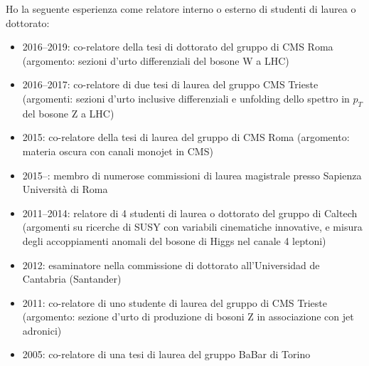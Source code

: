 \documentclass[11pt,twoside,a4paper]{article}
\begin{document}
Ho la seguente esperienza come relatore interno o esterno di studenti di laurea o dottorato:
\begin{itemize}
\item 2016--2019: co-relatore della tesi di dottorato del gruppo di
  CMS Roma (argomento: sezioni d'urto differenziali del bosone W a
  LHC)
\item 2016--2017: co-relatore di due tesi di laurea del gruppo CMS
  Trieste (argomenti: sezioni d'urto inclusive differenziali e
  unfolding dello spettro in $p_T$ del bosone Z a LHC)
\item 2015: co-relatore della tesi di laurea del gruppo di CMS Roma
  (argomento: materia oscura con canali monojet in CMS)
  \item 2015--: membro di numerose commissioni di laurea magistrale
    presso Sapienza Universit\`a di Roma
\item 2011--2014: relatore di 4 studenti di laurea o dottorato del
  gruppo di Caltech (argomenti su ricerche di SUSY con variabili
  cinematiche innovative, e misura degli accoppiamenti anomali del
  bosone di Higgs nel canale 4 leptoni)
\item 2012: esaminatore nella commissione di dottorato all'Universidad
  de Cantabria (Santander)
\item 2011: co-relatore di uno studente di laurea del gruppo di CMS
  Trieste (argomento: sezione d'urto di produzione di bosoni Z in
  associazione con jet adronici)
\item 2005: co-relatore di una tesi di laurea del gruppo BaBar di
    Torino
\end{itemize}
\end{document}
